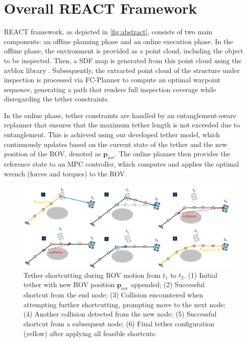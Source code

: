 \section{Overall \ac{REACT}  Framework}
\label{sec:framework}
\ac{REACT} framework, as depicted in \ref{fig:abstract}, consists of two main components: an offline planning phase and an online execution phase. In the offline phase, the environment is provided as a point cloud, including the object to be inspected. Then, a \ac{SDF} map is generated from this point cloud using the nvblox library \cite{nvblox}. Subsequently, the extracted point cloud of the structure under inspection is processed via FC-Planner \cite{feng2024fc} to compute an optimal waypoint sequence, generating a path that renders full inspection coverage while disregarding the tether constraints.

In the online phase, tether constraints are handled by an entanglement-aware replanner that ensures that the maximum tether length is not exceeded due to entanglement. This is achieved using our developed tether model, which continuously updates based on the current state of the tether and the new position of the \ac{ROV}, denoted as $\textbf{p}_{\mathrm{rov}}$. The online planner then provides the reference state to an \ac{MPC} controller, which computes and applies the optimal wrench (forces and torques) to the \ac{ROV}.




\begin{figure}[t!]
    \centering
    \includegraphics[width=1\linewidth]{EA-Planner/figures/tether_model.pdf}
    \caption{Tether shortcutting during \ac{ROV} motion from \( t_1 \) to \( t_2 \). (1) Initial tether with new \ac{ROV} position \( \mathbf{p}_{\text{rov}} \) appended; (2) Successful shortcut from the end node; (3) Collision encountered when attempting further shortcutting, prompting move to the next node; (4) Another collision detected from the new node; (5) Successful shortcut from a subsequent node; (6) Final tether configuration (yellow) after applying all feasible shortcuts.}
    \label{fig:tether}
\end{figure}



